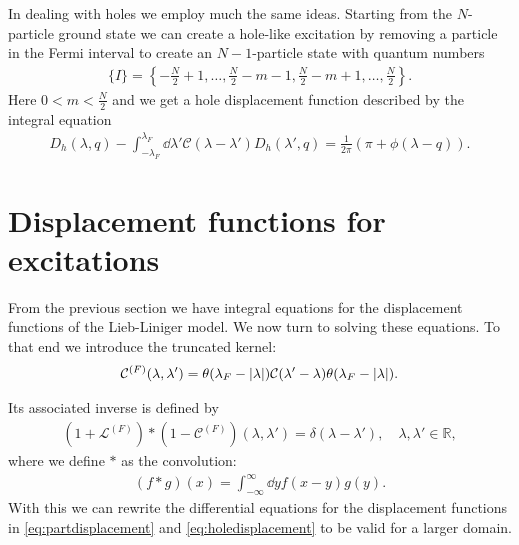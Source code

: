 \documentclass[11pt, a4paper]{report} %
\begin{document}
In dealing with holes we employ much the same ideas.
Starting from the \(N\)-particle ground state we can create a hole-like excitation by removing a particle in the Fermi interval to create an \(N-1\)-particle state with quantum numbers
\begin{align}
  \label{eq:26}
  \{I\} = \left\{-\frac{N}{2}+1,\ldots,\frac{N}{2}-m-1,\frac{N}{2}-m+1,\ldots,\frac{N}{2}\right\}.
\end{align}
Here \(0<m<\frac{N}{2}\) and we get a hole displacement function described by the integral equation~\cite{Caux2015}
\begin{align}
  \label{eq:holedisplacement}
  D_h(\lambda,q) - \int_{-\lambda_F}^{\lambda_F} \dd \lambda' \mathcal{C}(\lambda-\lambda') D_h(\lambda',q) = \frac{1}{2\pi}(\pi+\phi(\lambda-q)).
\end{align}






\section{Displacement functions for excitations}

From the previous section we have integral equations for the displacement functions of the Lieb-Liniger model.
We now turn to solving these equations.
To that end we introduce the truncated kernel:
\begin{align}
  \label{eq:inversetruncated}
  \mathcal{C}^{(F)}(\lambda,\lambda') = \theta(\lambda_F-\abs{\lambda}) \mathcal{C}(\lambda'-\lambda) \theta(\lambda_F-\abs{\lambda}).
\end{align}

Its associated inverse is defined by
\begin{align}
  \label{eq:32}
  	\left(1 + \mathcal{L}^{(F)}\right) * \left(1 - \mathcal{C}^{(F)}\right)(\lambda,\lambda')=\delta(\lambda-\lambda'), \quad \lambda, \lambda' \in \mathbb{R},
\end{align}
where we define \(*\) as the convolution:
\begin{align}
  \label{eq:29}
  (f*g)(x) = \int_{-\infty}^{\infty} \dd y f(x-y)g(y).
\end{align}
With this we can rewrite the differential equations for the displacement functions in \cref{eq:partdisplacement} and \cref{eq:holedisplacement} to be valid for a larger domain.
\end{document}
